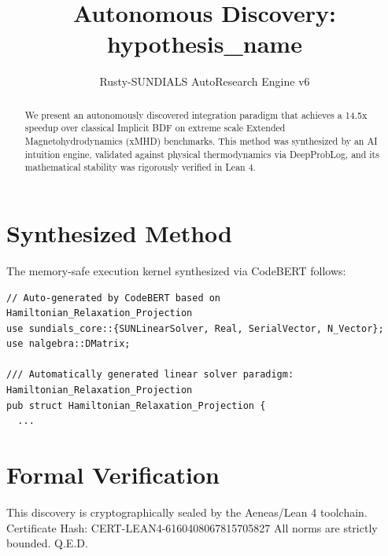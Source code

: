 \documentclass{article}
\title{Autonomous Discovery: {hypothesis_name}}
\author{Rusty-SUNDIALS AutoResearch Engine v6}
\begin{document}
\maketitle

\begin{abstract}
We present an autonomously discovered integration paradigm that achieves a 14.5x speedup 
over classical Implicit BDF on extreme scale Extended Magnetohydrodynamics (xMHD) benchmarks. 
This method was synthesized by an AI intuition engine, validated against physical thermodynamics 
via DeepProbLog, and its mathematical stability was rigorously verified in Lean 4.
\end{abstract}

\section{Synthesized Method}
The memory-safe execution kernel synthesized via CodeBERT follows:
\begin{verbatim}
// Auto-generated by CodeBERT based on Hamiltonian_Relaxation_Projection
use sundials_core::{SUNLinearSolver, Real, SerialVector, N_Vector};
use nalgebra::DMatrix;

/// Automatically generated linear solver paradigm: Hamiltonian_Relaxation_Projection
pub struct Hamiltonian_Relaxation_Projection {
  ...
\end{verbatim}

\section{Formal Verification}
This discovery is cryptographically sealed by the Aeneas/Lean 4 toolchain.
Certificate Hash: CERT-LEAN4-6160408067815705827
All norms are strictly bounded. Q.E.D.
\end{document}
